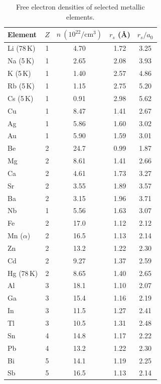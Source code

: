 \begin{table}[ht]
    \centering
    \caption{Free electron densities of selected metallic elements.}
    \label{tab:drude-densities}
    \begin{tabular}{lcccc}
        \toprule
        Element & $Z$ & $n\ (10^{22}/\mathrm{cm}^3)$ & $r_s$ (\AA) & $r_s/a_0$ \\
        \midrule
        Li (78\,K) & 1 & 4.70 & 1.72 & 3.25 \\
        Na (5\,K)  & 1 & 2.65 & 2.08 & 3.93 \\
        K  (5\,K)  & 1 & 1.40 & 2.57 & 4.86 \\
        Rb (5\,K)  & 1 & 1.15 & 2.75 & 5.20 \\
        Cs (5\,K)  & 1 & 0.91 & 2.98 & 5.62 \\
        Cu & 1 & 8.47 & 1.41 & 2.67 \\
        Ag & 1 & 5.86 & 1.60 & 3.02 \\
        Au & 1 & 5.90 & 1.59 & 3.01 \\
        Be & 2 & 24.7 & 0.99 & 1.87 \\
        Mg & 2 & 8.61 & 1.41 & 2.66 \\
        Ca & 2 & 4.61 & 1.73 & 3.27 \\
        Sr & 2 & 3.55 & 1.89 & 3.57 \\
        Ba & 2 & 3.15 & 1.96 & 3.71 \\
        Nb & 1 & 5.56 & 1.63 & 3.07 \\
        Fe & 2 & 17.0 & 1.12 & 2.12 \\
        Mn ($\alpha$) & 2 & 16.5 & 1.13 & 2.14 \\
        Zn & 2 & 13.2 & 1.22 & 2.30 \\
        Cd & 2 & 9.27 & 1.37 & 2.59 \\
        Hg (78\,K) & 2 & 8.65 & 1.40 & 2.65 \\
        Al & 3 & 18.1 & 1.10 & 2.07 \\
        Ga & 3 & 15.4 & 1.16 & 2.19 \\
        In & 3 & 11.5 & 1.27 & 2.41 \\
        Tl & 3 & 10.5 & 1.31 & 2.48 \\
        Sn & 4 & 14.8 & 1.17 & 2.22 \\
        Pb & 4 & 13.2 & 1.22 & 2.30 \\
        Bi & 5 & 14.1 & 1.19 & 2.25 \\
        Sb & 5 & 16.5 & 1.13 & 2.14 \\
        \bottomrule
    \end{tabular}
\end{table}

